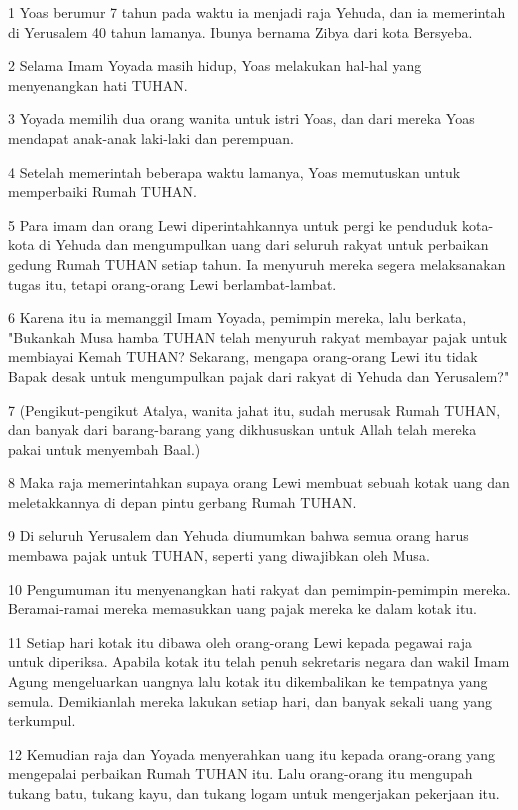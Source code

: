 \par 1 Yoas berumur 7 tahun pada waktu ia menjadi raja Yehuda, dan ia memerintah di Yerusalem 40 tahun lamanya. Ibunya bernama Zibya dari kota Bersyeba.
\par 2 Selama Imam Yoyada masih hidup, Yoas melakukan hal-hal yang menyenangkan hati TUHAN.
\par 3 Yoyada memilih dua orang wanita untuk istri Yoas, dan dari mereka Yoas mendapat anak-anak laki-laki dan perempuan.
\par 4 Setelah memerintah beberapa waktu lamanya, Yoas memutuskan untuk memperbaiki Rumah TUHAN.
\par 5 Para imam dan orang Lewi diperintahkannya untuk pergi ke penduduk kota-kota di Yehuda dan mengumpulkan uang dari seluruh rakyat untuk perbaikan gedung Rumah TUHAN setiap tahun. Ia menyuruh mereka segera melaksanakan tugas itu, tetapi orang-orang Lewi berlambat-lambat.
\par 6 Karena itu ia memanggil Imam Yoyada, pemimpin mereka, lalu berkata, "Bukankah Musa hamba TUHAN telah menyuruh rakyat membayar pajak untuk membiayai Kemah TUHAN? Sekarang, mengapa orang-orang Lewi itu tidak Bapak desak untuk mengumpulkan pajak dari rakyat di Yehuda dan Yerusalem?"
\par 7 (Pengikut-pengikut Atalya, wanita jahat itu, sudah merusak Rumah TUHAN, dan banyak dari barang-barang yang dikhususkan untuk Allah telah mereka pakai untuk menyembah Baal.)
\par 8 Maka raja memerintahkan supaya orang Lewi membuat sebuah kotak uang dan meletakkannya di depan pintu gerbang Rumah TUHAN.
\par 9 Di seluruh Yerusalem dan Yehuda diumumkan bahwa semua orang harus membawa pajak untuk TUHAN, seperti yang diwajibkan oleh Musa.
\par 10 Pengumuman itu menyenangkan hati rakyat dan pemimpin-pemimpin mereka. Beramai-ramai mereka memasukkan uang pajak mereka ke dalam kotak itu.
\par 11 Setiap hari kotak itu dibawa oleh orang-orang Lewi kepada pegawai raja untuk diperiksa. Apabila kotak itu telah penuh sekretaris negara dan wakil Imam Agung mengeluarkan uangnya lalu kotak itu dikembalikan ke tempatnya yang semula. Demikianlah mereka lakukan setiap hari, dan banyak sekali uang yang terkumpul.
\par 12 Kemudian raja dan Yoyada menyerahkan uang itu kepada orang-orang yang mengepalai perbaikan Rumah TUHAN itu. Lalu orang-orang itu mengupah tukang batu, tukang kayu, dan tukang logam untuk mengerjakan pekerjaan itu.
